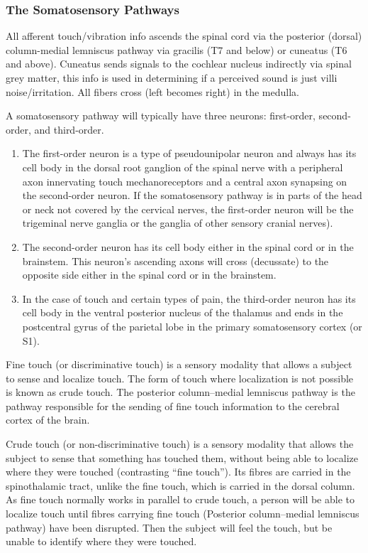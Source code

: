 \hypertarget{the-somatosensory-pathways}{%
\subsubsection{The Somatosensory
Pathways}\label{the-somatosensory-pathways}}

All afferent touch/vibration info ascends the spinal cord via the
posterior (dorsal) column-medial lemniscus pathway via gracilis (T7 and
below) or cuneatus (T6 and above). Cuneatus sends signals to the
cochlear nucleus indirectly via spinal grey matter, this info is used in
determining if a perceived sound is just villi noise/irritation. All
fibers cross (left becomes right) in the medulla.

A somatosensory pathway will typically have three neurons: first-order,
second-order, and third-order.

\begin{enumerate}
\def\labelenumi{\arabic{enumi}.}
\tightlist
\item
  The first-order neuron is a type of pseudounipolar neuron and always
  has its cell body in the dorsal root ganglion of the spinal nerve with
  a peripheral axon innervating touch mechanoreceptors and a central
  axon synapsing on the second-order neuron. If the somatosensory
  pathway is in parts of the head or neck not covered by the cervical
  nerves, the first-order neuron will be the trigeminal nerve ganglia or
  the ganglia of other sensory cranial nerves).
\item
  The second-order neuron has its cell body either in the spinal cord or
  in the brainstem. This neuron's ascending axons will cross (decussate)
  to the opposite side either in the spinal cord or in the brainstem.
\item
  In the case of touch and certain types of pain, the third-order neuron
  has its cell body in the ventral posterior nucleus of the thalamus and
  ends in the postcentral gyrus of the parietal lobe in the primary
  somatosensory cortex (or S1).
\end{enumerate}

Fine touch (or discriminative touch) is a sensory modality that allows a
subject to sense and localize touch. The form of touch where
localization is not possible is known as crude touch. The posterior
column--medial lemniscus pathway is the pathway responsible for the
sending of fine touch information to the cerebral cortex of the brain.

Crude touch (or non-discriminative touch) is a sensory modality that
allows the subject to sense that something has touched them, without
being able to localize where they were touched (contrasting ``fine
touch''). Its fibres are carried in the spinothalamic tract, unlike the
fine touch, which is carried in the dorsal column. As fine touch
normally works in parallel to crude touch, a person will be able to
localize touch until fibres carrying fine touch (Posterior
column--medial lemniscus pathway) have been disrupted. Then the subject
will feel the touch, but be unable to identify where they were touched.

